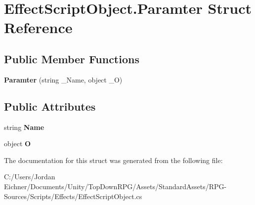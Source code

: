 \hypertarget{struct_effect_script_object_1_1_paramter}{}\section{Effect\+Script\+Object.\+Paramter Struct Reference}
\label{struct_effect_script_object_1_1_paramter}
\subsection*{Public Member Functions}
\begin{DoxyCompactItemize}
\item 
\hypertarget{struct_effect_script_object_1_1_paramter_a4976df3086256963524914b441684202}{}{\bfseries Paramter} (string \+\_\+\+Name, object \+\_\+\+O)\label{struct_effect_script_object_1_1_paramter_a4976df3086256963524914b441684202}

\end{DoxyCompactItemize}
\subsection*{Public Attributes}
\begin{DoxyCompactItemize}
\item 
\hypertarget{struct_effect_script_object_1_1_paramter_ac64c1d743c49f514f3b9eed444743ca0}{}string {\bfseries Name}\label{struct_effect_script_object_1_1_paramter_ac64c1d743c49f514f3b9eed444743ca0}

\item 
\hypertarget{struct_effect_script_object_1_1_paramter_ae53d84d7ec439dcc27230b13d487c203}{}object {\bfseries O}\label{struct_effect_script_object_1_1_paramter_ae53d84d7ec439dcc27230b13d487c203}

\end{DoxyCompactItemize}


The documentation for this struct was generated from the following file\+:\begin{DoxyCompactItemize}
\item 
C\+:/\+Users/\+Jordan Eichner/\+Documents/\+Unity/\+Top\+Down\+R\+P\+G/\+Assets/\+Standard\+Assets/\+R\+P\+G-\/\+Sources/\+Scripts/\+Effects/Effect\+Script\+Object.\+cs\end{DoxyCompactItemize}
